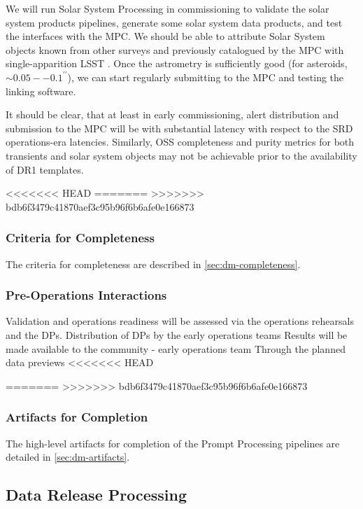 We will run Solar System Processing in commissioning to validate the solar system products pipelines, generate some solar system data products, and test the interfaces with the MPC. 
We should be able to attribute Solar System objects known from other surveys and previously catalogued by the MPC with single-apparition LSST \DIASources.
Once the astrometry is sufficiently good (for asteroids,  $\sim0.05--0.1^{\prime\prime}$), we can start regularly submitting to the MPC and testing the linking software. 

It should be clear, that at least in early commissioning, alert distribution and submission to the MPC will be with substantial latency with respect to the SRD operations-era latencies.  
Similarly, OSS completeness and purity metrics for both transients and solar system objects may not be achievable prior to the availability of DR1 templates.

<<<<<<< HEAD
=======
>>>>>>> bdb6f3479c41870aef3c95b96f6b6afe0e166873
\subsubsection{Criteria for Completeness}
The criteria for completeness are described in \ref{sec:dm-completeness}. 

\subsubsection{Pre-Operations Interactions}
Validation and operations readiness will be assessed via the operations rehearsals and the DPs. 
Distribution of DPs by the early operations teams
Results will be made available to the community - early operations team 
Through the planned data previews 
<<<<<<< HEAD

=======
>>>>>>> bdb6f3479c41870aef3c95b96f6b6afe0e166873

\subsubsection{Artifacts for Completion}
The high-level artifacts for completion of the Prompt Processing pipelines are detailed in \ref{sec:dm-artifacts}.  

\subsection{Data Release Processing}

